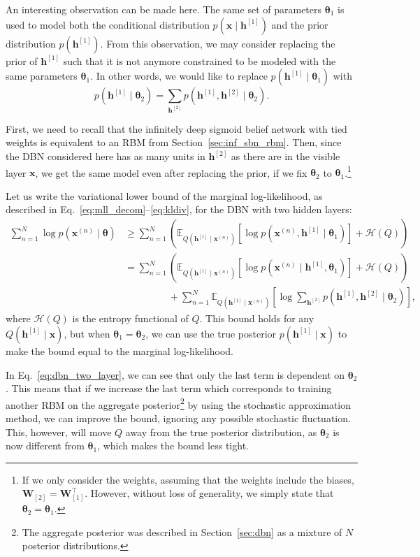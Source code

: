 \documentclass{now}
\newcommand{\qlay}[1]{\left[#1\right]}
\newcommand{\vect}[1]{\mathbf{#1}}
\newcommand{\vects}[1]{\boldsymbol{#1}}
\newcommand{\matr}[1]{\mathbf{#1}}
\newcommand{\vh}[0]{\vect{h}}
\newcommand{\vx}[0]{\vect{x}}
\newcommand{\mW}[0]{\matr{W}}
\newcommand{\TT}[0]{{\vects{\theta}}}
\newcommand{\HH}[0]{\mathcal{H}}
\newcommand{\E}[0]{\mathbb{E}}
\begin{document}
An interesting observation can be made here.  The same set of parameters $\TT_1$
is used to model both the conditional distribution $p(\vx \mid \vh^{\qlay{1}})$
and the prior distribution $p(\vh^{\qlay{1}})$. From this observation, we may
consider replacing the prior of $\vh^{\qlay{1}}$ such that it is not anymore
constrained to be modeled with the same parameters $\TT_1$.  In other words, we
would like to replace $p(\vh^{\qlay{1}} \mid \TT_1)$ with
\[
p(\vh^{\qlay{1}} \mid \TT_2) = \sum_{\vh^{\qlay{2}}} p(\vh^{\qlay{1}},
\vh^{\qlay{2}} \mid \TT_2).
\]

First, we need to recall that the infinitely deep sigmoid belief network with
tied weights is equivalent to an RBM from Section~\ref{sec:inf_sbn_rbm}. Then,
since the DBN considered here has as many units in $\vh^{\qlay{2}}$ as there are
in the visible layer $\vx$, we get the same model even after replacing the
prior, if we fix $\TT_2$ to $\TT_1$.\footnote{ 
    If we only consider the weights, assuming that the weights include the
    biases, $\mW_{\qlay{2}}=\mW_{\qlay{1}}^\top$.  However, without loss of
    generality, we simply state that $\TT_2=\TT_1$.  
}

Let us write the variational lower bound of the marginal log-likelihood, as
described in Eq.~\eqref{eq:mll_decom}--\eqref{eq:kldiv}, for the DBN with two
hidden layers:
\begin{align}
    \label{eq:dbn_two_layer}
    \sum_{n=1}^N \log p(\vx^{(n)} \mid \TT) &\geq
    \sum_{n=1}^N \left(\E_{Q(\vh^{\qlay{1}} \mid \vx^{(n)})} \left[
    \log p(\vx^{(n)}, \vh^{\qlay{1}} \mid \TT_1)
    \right] + \HH(Q)\right) 
    \nonumber \\
    &= \sum_{n=1}^N \left(\E_{Q(\vh^{\qlay{1}} \mid \vx^{(n)})} \left[
    \log p(\vx^{(n)} \mid \vh^{\qlay{1}}, \TT_1) \right] +
    \HH(Q)\right)
    \nonumber \\
    &\phantom{= \sum_{n=1}^N} + \sum_{n=1}^N
    \E_{Q(\vh^{\qlay{1}} \mid \vx^{(n)})} \left[ \log
    \sum_{\vh^{\qlay{2}}} p(\vh^{\qlay{1}}, \vh^{\qlay{2}} \mid \TT_2) \right]
    ,
\end{align}
where $\HH(Q)$ is the entropy functional of $Q$. This bound holds for any
$Q(\vh^{\qlay{1}} \mid \vx)$, but when $\TT_1 = \TT_2$, we can use the true
posterior $p(\vh^{\qlay{1}} \mid \vx)$ to make the bound equal to the marginal
log-likelihood.

In Eq.~\eqref{eq:dbn_two_layer}, we can see that only the last term is dependent
on $\TT_2$. This means that if we increase the last term which corresponds to
training another RBM on the aggregate posterior\footnote{
    The aggregate posterior was described in Section~\ref{sec:dbn} as a mixture
    of $N$ posterior distributions.
} by using the stochastic approximation method, we can improve the bound,
ignoring any possible stochastic fluctuation.  This, however, will move $Q$ away
from the true posterior distribution, as $\TT_2$ is now different from $\TT_1$,
which makes the bound less tight.
\end{document}
